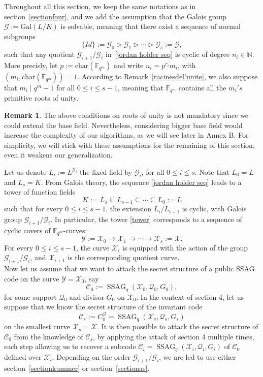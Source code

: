 \documentclass[10pt]{article}
\theoremstyle{definition}
\newtheorem{rq1}[thm]{Remark}
\theoremstyle{definition}
\theoremstyle{definition}
\newcommand{\C}{\mathcal{C}}
\newcommand{\N}{\mathbb{N}}
\newcommand{\fqm}{\mathbb{F}_{q^m}}
\newcommand{\su}{\subseteq}
\newcommand{\X}{\mathcal{X}}
\newcommand{\Y}{\mathcal{Y}}
\newcommand{\QR}{\mathcal{Q}}
\newcommand{\G}{\mathcal{G}}
\newcommand{\ssag}{\operatorname{SSAG}}
\begin{document}
Throughout all this section, we keep the same notations as in section~\ref{sectionfour}, and we add the assumption that the Galois group $\G := \mathrm{Gal}(L/K)$ is solvable,   meaning that there exist a sequence of normal subgroups 
\begin{equation} \label{jordan holder seq}
 \{Id\} := \G_0 \triangleright \G_1 \triangleright \cdots \triangleright \G_s := \G, 
\end{equation} 
such that any quotient $\G_{i+1}/\G_i$ in~\eqref{jordan holder seq} is cyclic of degree $n_i \in \N$. 
More precisly, let $p := \mathrm{char}(\fqm)$ and write $n_i = p^{r_i}m_i$, with $(m_i,\mathrm{char}(\fqm))=1$. According to Remark~\ref{racinesdel'unite}, we also suppose that $m_i \mid q^m-1$ for all $0\leq i\leq s-1$, meaning that $\fqm$ contains all the $m_i's$ primitive roots of unity. 

\begin{rq1} \label{base_filed_extension}
The above conditions on roots of unity is not mandatory since we could extend the base field. Nevertheless, considering bigger base field would increase the complexity of our algorithms, as we will see later in Annex B. For simplicity, we will stick with these assumptions for the remaining of this section, even it weakens our generalization.  
\end{rq1}

Let us denote $L_i := L^{\G_i}$ the fixed field by $\G_i$, for all $0 \leq i \leq s$. Note that $L_0=L$ and $L_s=K$. From Galois theory, the sequence \eqref{jordan holder seq} leads to a tower of function fields
\begin{equation} \label{tower}
K := L_s \su L_{s-1} \su \cdots \su L_0 := L
\end{equation}
such that for every $0\leq i\leq s-1$, the extension $L_i/L_{i+1}$ is cyclic, with Galois group $\G_{i+1}/\G_i$. In particular, the tower \eqref{tower} corresponds to a sequence of cyclic covers of $\fqm$-curves:
\begin{equation} \label{curve tower}
\Y := \X_0 \longrightarrow \X_1 \longrightarrow \cdots \longrightarrow \X_s := \X.
\end{equation}
For every $0 \leq i \leq s-1$, the curve $\X_i$ is equipped with the action of the group $\G_{i+1}/\G_i$, and $\X_{i+1}$ is the corresponding quotient curve. \\
Now let us assume that we want to attack the secret structure of a public SSAG code on the curve $\Y=\X_0$, say
\[\C_0 := \ssag_q(\X_0,\QR_0,G_0),\]
for some support $\QR_0$ and divisor $G_0$ on $\X_0$. In the context of section 4, let us suppose that we know the secret structure of the invariant code 
\[\C_s:= C_0^{\G} = \ssag_q(\X_s,\QR_s,G_s)\]
on the smallest curve $\X_s=\X$. It is then possible to attack the secret structure of $\C_0$ from the knowledge of $\C_s$, by applying the attack of section 4 multiple times, each step allowing us to recover a subcode $\C_i=\ssag_q(\X_i,\QR_i,G_i)$ of $\C_0$ defined over $\X_i$. Depending on the order $\G_{i+1}/\G_i$, we are led to use either section~\ref{sectionkummer} or section~\ref{sectionas}.
\end{document}
